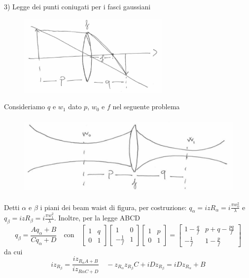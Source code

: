\documentclass{book}
\def \l {\lambda}
\theoremstyle{remark}
\begin{document}
3) Legge dei punti coniugati per i fasci gaussiani
\begin{figure}[H]
\centering
\includegraphics[height=4cm]{images/5}
\end{figure}
Consideriamo $q$ e $w_1$ dato $p$, $w_0$ e $f$ nel seguente problema
\begin{figure}[H]
\centering
\includegraphics[height=4cm]{images/6}
\end{figure}
Detti $\alpha$ e $\beta$ i piani dei beam waist di figura, per costruzione: $q_\alpha = izR_\alpha =i\frac{\pi w_0^2}{\l}$ e $q_\beta = izR_\beta = i\frac{\pi w_1^2}{\l}$.
Inoltre, per la legge ABCD
\begin{equation*}
q_\beta = \frac{Aq_\alpha + B}{Cq_\alpha + D} \quad \text{con} \quad
\begin{bmatrix}
1	&	q\\
0	&	1
\end{bmatrix} \begin{bmatrix}
1	&	0\\
-\frac{1}{f}	&	1
\end{bmatrix} \begin{bmatrix}
1	&	p\\
0	&	1
\end{bmatrix}
=
\begin{bmatrix}
1-\frac{q}{f}	&	p + q - \frac{pq}{f}\\
-\frac{1}{f}	&	1 - \frac{p}{f}
\end{bmatrix}
\end{equation*}
da cui
\begin{equation*}
iz_{R_\beta} = \frac{iz_{R_\alpha A + B}}{iz_{R\alpha C + D}}\quad -z_{R_\alpha} z_{R_\beta} C +iDz_{R_\beta} = iDz_{R_\alpha} + B
\end{equation*}
\end{document}
